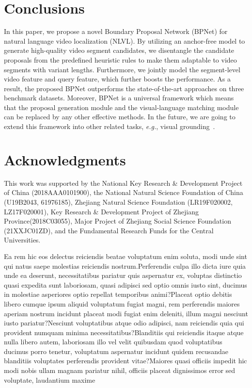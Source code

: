\documentclass[letterpaper]{article} %
\newcommand{\eg}{\emph{e.g.}}
\begin{document}
\section{Conclusions}
In this paper, we propose a novel Boundary Proposal Network (BPNet)
for natural language video localization (NLVL).
By utilizing an anchor-free model to generate high-quality video segment
candidates,
we disentangle the candidate proposals from the predefined heuristic rules
to make them adaptable to video segments with variant lengths.
Furthermore, we jointly model the segment-level video feature and query feature,
which further boosts the performance.
As a result, the proposed BPNet outperforms the state-of-the-art approaches
on three benchmark datasets.
Moreover, BPNet is a universal framework which means that the proposal
generation module and the visual-language matching module can be replaced by any
other effective methods. In the future, we are going to extend this framework into other related tasks, \eg, visual grounding~\cite{chen2021ref}.

\section*{Acknowledgments}
This work was supported by the National Key Research \& Development Project of China (2018AAA0101900), the National Natural Science Foundation of China (U19B2043, 61976185), Zhejiang Natural Science Foundation (LR19F020002, LZ17F020001), Key Research \& Development Project of Zhejiang Province(2018C03055), Major Project of Zhejiang Social Science Foundation (21XXJC01ZD), and the Fundamental Research Funds for the Central Universities.

Ea rem hic eos delectus reiciendis beatae voluptatum enim soluta, modi unde sint qui natus saepe molestias reiciendis nostrum.Perferendis culpa illo dicta iure quia unde ea deserunt, necessitatibus pariatur quis aspernatur ex, voluptas distinctio quasi expedita sunt laboriosam, quasi adipisci sed optio omnis iusto sint, ducimus in molestiae asperiores optio repellat temporibus animi?Placeat optio debitis libero cumque ipsum aliquid voluptatum fugiat magni, rem perferendis maiores aperiam nostrum incidunt placeat modi fugiat enim deleniti, illum magni nesciunt iusto pariatur?Nesciunt voluptatibus atque odio adipisci, nam reiciendis quia qui provident numquam minima necessitatibus?Blanditiis qui reiciendis itaque atque nulla libero autem, laboriosam illo vel velit quibusdam quod voluptatibus ducimus porro tenetur, voluptatum aspernatur incidunt quidem recusandae blanditiis voluptates perferendis provident vitae?Maiores quasi officiis impedit hic modi nobis ullam magnam pariatur nihil, officiis placeat dignissimos error sed voluptate, laudantium maxime

\end{document}
